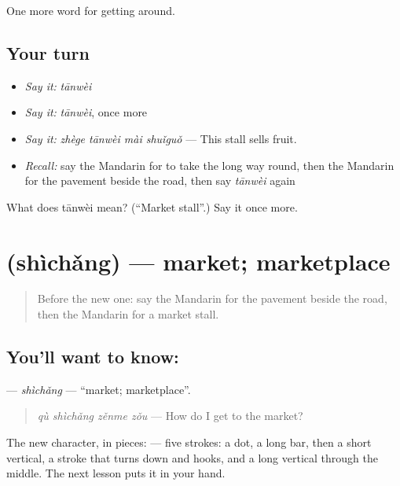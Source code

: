 \begin{grammarlens}[title={What you've built}]
One more word for getting around.
\end{grammarlens}

\subsection*{Your turn}
\begin{itemize}
\raggedright
  \item \emph{Say it:} \emph{tānwèi}
  \item \emph{Say it:} \emph{tānwèi}, once more
  \item \emph{Say it:} \emph{zhège tānwèi mài shuǐguǒ} — This stall sells fruit.
  \item \emph{Recall:} say the Mandarin for to take the long way round, then the Mandarin for the pavement beside the road, then say \emph{tānwèi} again
\end{itemize}

\begin{tcolorbox}[breakable,colback=teal!4,colframe=teal!35!black,title={Before you move on}]
What does tānwèi mean? (\textquotedblleft{}Market stall\textquotedblright{}.) Say it once more.
\end{tcolorbox}
\section[\texorpdfstring{\zh{市场} (shìchǎng)}{市场 (shìchǎng)}]{ (shìchǎng) — market; marketplace}

\label{lesson:ZH-C448-shichang}



\begin{quote}
Before the new one: say the Mandarin for the pavement beside the road, then the Mandarin for a market stall.
\end{quote}

\subsection*{You'll want to know: }
\textbf{} — \emph{shìchǎng} — \textquotedblleft{}market; marketplace\textquotedblright{}.

\begin{quote}
\textbf{} \emph{qù shìchǎng zěnme zǒu} — How do I get to the market?
\end{quote}

The new character, in pieces:  — five strokes: a dot, a long bar, then a short vertical, a stroke that turns down and hooks, and a long vertical through the middle. The next lesson puts it in your hand.

